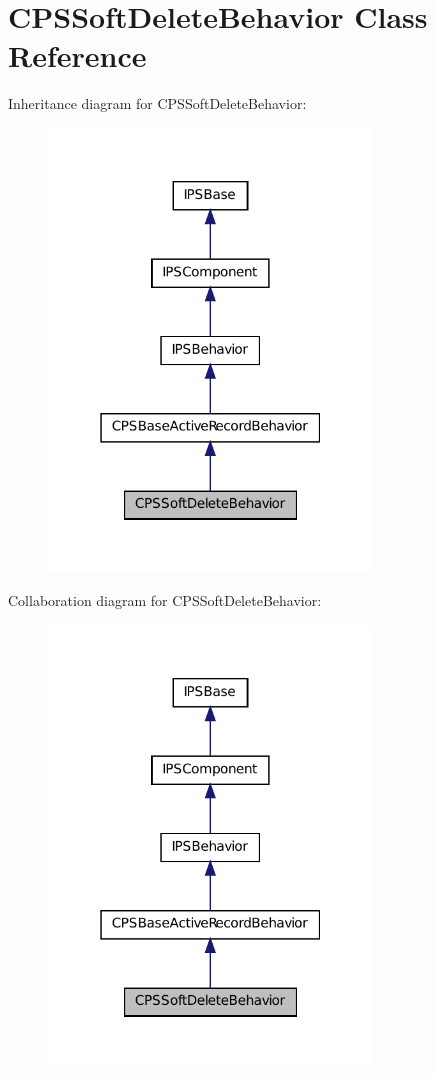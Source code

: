 \hypertarget{classCPSSoftDeleteBehavior}{
\section{CPSSoftDeleteBehavior Class Reference}
\label{classCPSSoftDeleteBehavior}
}


Inheritance diagram for CPSSoftDeleteBehavior:\nopagebreak
\begin{figure}[H]
\begin{center}
\leavevmode
\includegraphics[width=244pt]{classCPSSoftDeleteBehavior__inherit__graph}
\end{center}
\end{figure}


Collaboration diagram for CPSSoftDeleteBehavior:\nopagebreak
\begin{figure}[H]
\begin{center}
\leavevmode
\includegraphics[width=244pt]{classCPSSoftDeleteBehavior__coll__graph}
\end{center}
\end{figure}
